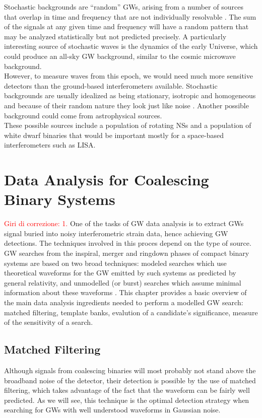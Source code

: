 \documentclass[binding=0.6cm, LaM]{sapthesis}
\newcommand{\fpg}[1]{\textcolor{red}{#1} }
\begin{document}
	Stochastic backgrounds are “random” GWs, 
	arising from a  number of sources that overlap 
	in time and frequency that are not individually resolvable \cite{22}. 
	The sum of the signals at any given time and frequency will have 
	a random pattern that may be analyzed statistically but not predicted precisely.
	A particularly interesting source of stochastic waves is the dynamics of the early Universe, 
	which could produce an all-sky GW background, 
	similar to the cosmic microwave background. \\ 
	However, to measure waves from this epoch, 
	we would need much more sensitive detectors than the ground-based interferometers available.
	Stochastic backgrounds are usually idealized as being stationary, 
	isotropic and homogeneous and because of their random nature they look just like noise \cite{4}.	
	Another possible background could come from astrophysical sources. \\ 
	These possible sources include a population of rotating NSs 
	and a population of white dwarf binaries that would be important mostly for a space-based interferometers such as LISA. 

\chapter{Data Analysis for Coalescing Binary Systems}
\fpg{Giri di correzione: 1.}%
	One of the tasks of GW data analysis is to extract GWs signal 
	buried into noisy interferometric strain data, hence achieving GW detections.
	The techniques involved in this proces depend on the type of source.
	GW searches from the inspiral, merger and ringdown phases of compact binary systems 
	are based on two broad techniques: 
	modeled searches which use theoretical waveforms for the GW emitted by such systems 
	as predicted by general relativity, and 
	unmodelled (or burst) searches which assume minimal information about these waveforms \cite{23}.
        This chapter provides a basic overview of the main data analysis ingredients needed to perform a modelled GW search:
        matched filtering, template banks, evalution of a candidate's significance, measure of the sensitivity of a search.

\section{Matched Filtering}
\label{sec:matched_filtering}
	Although signals from coalescing binaries will most probably not stand above the broadband noise of the detector, 
	their detection is possible by the use of matched filtering, 
	which takes advantage of the fact that the waveform can be fairly well predicted. 
	As we will see, this technique is the optimal detection strategy when searching for GWs
        with well understood waveforms in Gaussian noise.
\end{document}
